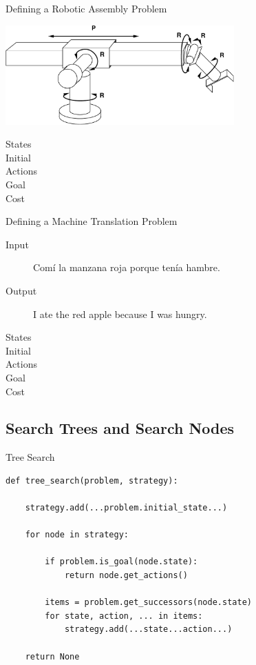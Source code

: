\documentclass[14pt]{beamer}
\begin{document}
\begin{frame}{Defining a Robotic Assembly Problem}
\begin{center}
\includegraphics[height=1.5in]{stanford-arm.pdf}
\end{center}
\begin{description}
\item[States] 
\item[Initial] 
\item[Actions] 
\item[Goal] 
\item[Cost] 
\end{description}
\end{frame}

\begin{frame}{Defining a Machine Translation Problem}
\begin{description}
\item[Input] Com\'i la manzana roja porque ten\'ia hambre.
\item[Output] I ate the red apple because I was hungry.
\bigskip\bigskip
\item[States]
\item[Initial]
\item[Actions]
\item[Goal]
\item[Cost]
\end{description}
\end{frame}

\subsection{Search Trees and Search Nodes}

\begin{frame}[fragile]{Tree Search}
\footnotesize
\begin{lstlisting}
def tree_search(problem, strategy):

    strategy.add(...problem.initial_state...)

    for node in strategy:

        if problem.is_goal(node.state):
            return node.get_actions()

        items = problem.get_successors(node.state)
        for state, action, ... in items:
            strategy.add(...state...action...)

    return None
\end{lstlisting}
\end{frame}
\end{document}
